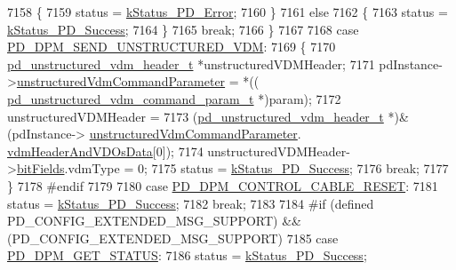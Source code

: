 \begin{DoxyCode}
7158             \{
7159                 status = \hyperlink{group__usb__pd__stack_ggaaad4cd00dd02567c6169429e3a895073a4d58370b8ee8d3d2a4c477f7a3f84dda}{kStatus\_PD\_Error};
7160             \}
7161             \textcolor{keywordflow}{else}
7162             \{
7163                 status = \hyperlink{group__usb__pd__stack_ggaaad4cd00dd02567c6169429e3a895073acf06f954f9c52f560cea34df48c63555}{kStatus\_PD\_Success};
7164             \}
7165             \textcolor{keywordflow}{break};
7166         \}
7167 
7168         \textcolor{keywordflow}{case} \hyperlink{group__usb__pd__stack_ggabf2676c3360b7c572954ae09c0a5e46aaa91f5407fe2e9e626a11c16f151dced1}{PD\_DPM\_SEND\_UNSTRUCTURED\_VDM}:
7169         \{
7170             \hyperlink{struct__pd__unstructured__vdm__header}{pd\_unstructured\_vdm\_header\_t} *unstructuredVDMHeader;
7171             pdInstance->\hyperlink{struct__pd__instance_a38406a43dd1715456b1111ad897d8120}{unstructuredVdmCommandParameter} = *((
      \hyperlink{struct__pd__unstructured__vdm__param}{pd\_unstructured\_vdm\_command\_param\_t} *)param);
7172             unstructuredVDMHeader =
7173                 (\hyperlink{struct__pd__unstructured__vdm__header}{pd\_unstructured\_vdm\_header\_t} *)&(pdInstance->
      \hyperlink{struct__pd__instance_a38406a43dd1715456b1111ad897d8120}{unstructuredVdmCommandParameter}.
      \hyperlink{struct__pd__unstructured__vdm__param_ace459022833c093044261a805aca67ac}{vdmHeaderAndVDOsData}[0]);
7174             unstructuredVDMHeader->\hyperlink{struct__pd__unstructured__vdm__header_aebbb7159bc0e5a41e886be38105a0415}{bitFields}.vdmType = 0;
7175             status = \hyperlink{group__usb__pd__stack_ggaaad4cd00dd02567c6169429e3a895073acf06f954f9c52f560cea34df48c63555}{kStatus\_PD\_Success};
7176             \textcolor{keywordflow}{break};
7177         \}
7178 \textcolor{preprocessor}{#endif
}
7179 \textcolor{preprocessor}{}
7180         \textcolor{keywordflow}{case} \hyperlink{group__usb__pd__stack_ggabf2676c3360b7c572954ae09c0a5e46aae13452ea340b015ac0aee25132562737}{PD\_DPM\_CONTROL\_CABLE\_RESET}:
7181             status = \hyperlink{group__usb__pd__stack_ggaaad4cd00dd02567c6169429e3a895073acf06f954f9c52f560cea34df48c63555}{kStatus\_PD\_Success};
7182             \textcolor{keywordflow}{break};
7183 
7184 \textcolor{preprocessor}{#if (defined PD\_CONFIG\_EXTENDED\_MSG\_SUPPORT) && (PD\_CONFIG\_EXTENDED\_MSG\_SUPPORT)
}
7185 \textcolor{preprocessor}{}        \textcolor{keywordflow}{case} \hyperlink{group__usb__pd__stack_ggabf2676c3360b7c572954ae09c0a5e46aad86c8e205d8307f0e9891f594f801fd3}{PD\_DPM\_GET\_STATUS}:
7186             status = \hyperlink{group__usb__pd__stack_ggaaad4cd00dd02567c6169429e3a895073acf06f954f9c52f560cea34df48c63555}{kStatus\_PD\_Success};

\end{DoxyCode}
